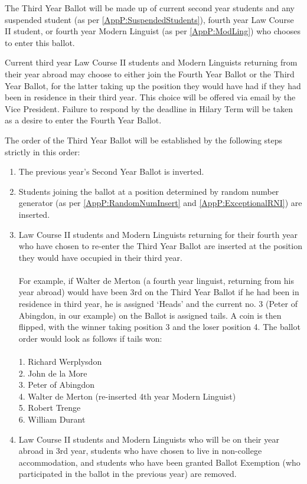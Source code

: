 \npara The Third Year Ballot will be made up of current second year students and any suspended student (as per \ref{AppP:SuspendedStudents}), fourth year Law Course II student, or fourth year Modern Linguist (as per \ref{AppP:ModLing}) who chooses to enter this ballot.

\npara \label{AppP:ModLing}Current third year Law Course II students and Modern Linguists returning from their year abroad may choose to either join the Fourth Year Ballot or the Third Year Ballot, for the latter taking up the position they would have had if they had been in residence in their third year. This choice will be offered via email by the Vice President. Failure to respond by the deadline in Hilary Term will be taken as a desire to enter the Fourth Year Ballot.

\npara The order of the Third Year Ballot will be established by the following steps strictly in this order:
\begin{enumerate}
\item The previous year’s Second Year Ballot is inverted.
\item  	Students joining the ballot at a position determined by random number generator (as per \ref{AppP:RandomNumInsert} and \ref{AppP:ExceptionalRNI}) are inserted. 
\item Law Course II students and Modern Linguists returning for their fourth year who have chosen to re-enter the Third Year Ballot are inserted at the position they would have occupied in their third year. \\ \\
For example, if Walter de Merton (a fourth year linguist, returning from his year abroad) would have been 3rd on the Third Year Ballot if he had been in residence in third year, he is assigned ‘Heads’ and the current no. 3 (Peter of Abingdon, in our example) on the Ballot is assigned tails. A coin is then flipped, with the winner taking position 3 and the loser position 4. The ballot order would look as follows if tails won: \\ \\
1. Richard Werplysdon \\
2. John de la More \\
3. Peter of Abingdon \\
4. Walter de Merton (re-inserted 4th year Modern Linguist) \\
5. Robert Trenge \\
6. William Durant \\
\item  Law Course II students and Modern Linguists who will be on their year abroad in 3rd year, students who have chosen to live in non-college accommodation, and students who have been granted Ballot Exemption (who participated in the ballot in the previous year) are removed.
\end{enumerate}

